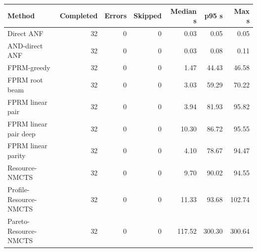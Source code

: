 \begin{tabular}{lrrrrrr}
\toprule
Method & Completed & Errors & Skipped & Median s & p95 s & Max s \\
\midrule
Direct ANF & 32 & 0 & 0 & 0.03 & 0.05 & 0.05 \\
AND-direct ANF & 32 & 0 & 0 & 0.03 & 0.08 & 0.11 \\
FPRM-greedy & 32 & 0 & 0 & 1.47 & 44.43 & 46.58 \\
FPRM root beam & 32 & 0 & 0 & 3.03 & 59.29 & 70.22 \\
FPRM linear pair & 32 & 0 & 0 & 3.94 & 81.93 & 95.82 \\
FPRM linear pair deep & 32 & 0 & 0 & 10.30 & 86.72 & 95.55 \\
FPRM linear parity & 32 & 0 & 0 & 4.10 & 78.67 & 94.47 \\
Resource-NMCTS & 32 & 0 & 0 & 9.70 & 90.02 & 94.55 \\
Profile-Resource-NMCTS & 32 & 0 & 0 & 11.33 & 93.68 & 102.74 \\
Pareto-Resource-NMCTS & 32 & 0 & 0 & 117.52 & 300.30 & 300.64 \\
\bottomrule
\end{tabular}
